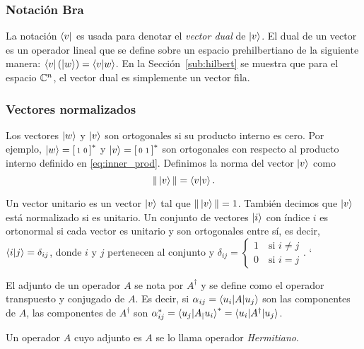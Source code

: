 \subsubsection{Notación Bra}
La notación $\bra{v}$ es usada para denotar el \emph{vector dual} de $\ket{v}$. El dual de un vector es un operador lineal que se define sobre un espacio prehilbertiano de la siguiente manera: $\bra{v}(\ket{w}) = \braket{v|w}$. En la Sección~\ref{sub:hilbert} se muestra que para el espacio $\mathbb{C}^n$, el vector dual es simplemente un vector fila.

\subsubsection{Vectores normalizados}


Los vectores $\ket{w}$ y $\ket{v}$ son ortogonales si su producto interno es cero. Por ejemplo, \(\ket{w}=\begin{bsmallmatrix}
    1 & 0
\end{bsmallmatrix}^*\) y \(\ket{v}=\begin{bsmallmatrix}
    0 & 1
\end{bsmallmatrix}^*\) son ortogonales con respecto al producto interno definido en \ref{eq:inner_prod}. Definimos la norma del vector $\ket{v}$ como
\begin{equation}
    \Vert \ket{v} \Vert = \braket{v|v}.
\end{equation}


Un vector unitario es un vector $\ket{v}$ tal que $\Vert \ket{v} \Vert = 1$. También decimos que $\ket{v}$ está normalizado si es unitario. Un conjunto de vectores $\ket{i}$ con índice $i$ es ortonormal si cada vector es unitario y son ortogonales entre sí, es decir, $\braket{i|j} = \delta_{ij}$, donde $i$ y $j$ pertenecen al conjunto y \(\delta_{ij} = \begin{cases}
1 \quad\text{si } i\neq j\\
0 \quad\text{si } i=j
\end{cases}\).
`
\begin{definicion}[Adjunto]
El adjunto de un operador $A$ se nota por $A^\dagger$ y se define como el operador transpuesto y conjugado de $A$. Es decir, si $\alpha_{ij}=\braket{u_i|A|u_j}$ son las componentes de $A$, las componentes de $A^\dagger$ son $\alpha^*_{ij} = \braket{u_j|A_|u_i}^* = \braket{u_i|A^\dagger|u_j}$.
\end{definicion}

\begin{definicion}
    Un operador $A$ cuyo adjunto es $A$ se lo llama operador \emph{Hermitiano}.
\end{definicion}

